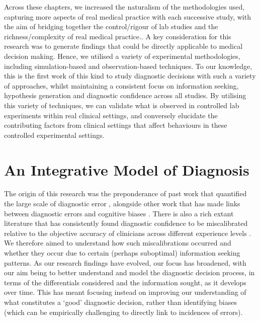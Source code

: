 \documentclass[a4paper, nobind]{templates/ociamthesis}
\begin{document}
Across these chapters, we increased the naturalism of the methodologies used, capturing more aspects of real medical practice with each successive study, with the aim of bridging together the control/rigour of lab studies and the richness/complexity of real medical practice.. A key consideration for this research was to generate findings that could be directly applicable to medical decision making. Hence, we utilised a variety of experimental methodologies, including simulation-based and observation-based techniques. To our knowledge, this is the first work of this kind to study diagnostic decisions with such a variety of approaches, whilst maintaining a consistent focus on information seeking, hypothesis generation and diagnostic confidence across all studies. By utilising this variety of techniques, we can validate what is observed in controlled lab experiments within real clinical settings, and conversely elucidate the contributing factors from clinical settings that affect behaviours in these controlled experimental settings.

\section{An Integrative Model of Diagnosis}\label{an-integrative-model-of-diagnosis}

The origin of this research was the preponderance of past work that quantified the large scale of diagnostic error \autocite{kohn_errors_2000,mcglynn_measurement_2015}, alongside other work that has made links between diagnostic errors and cognitive biases \autocite{crowley_automated_2013,restrepo_annals_2020}. There is also a rich extant literature that has consistently found diagnostic confidence to be miscalibrated relative to the objective accuracy of clinicians across different experience levels \autocite{friedman_are_2001,yang_effect_2012,meyer_physicians_2013}. We therefore aimed to understand how such miscalibrations occurred and whether they occur due to certain (perhaps suboptimal) information seeking patterns. As our research findings have evolved, our focus has broadened, with our aim being to better understand and model the diagnostic decision process, in terms of the differentials considered and the information sought, as it develops over time. This has meant focusing instead on improving our understanding of what constitutes a `good' diagnostic decision, rather than identifying biases (which can be empirically challenging to directly link to incidences of errors).
\end{document}
